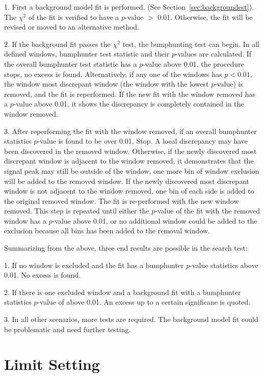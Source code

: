     1.  First a background model fit is performed. (See Section~\ref{sec:backgroundest}). The $\chi^{2}$ of the fit is verified to have a $p$-value $>$ 0.01. Otherwise, the fit will be revised or moved to an alternative method.

    2.  If the background fit passes the $\chi^{2}$ test, the bumphunting test can begin. In all defined windows, bumphunter test statistic and their $p$-values are calculated. If the overall bumphunter test statistic has a $p$-value above 0.01, the procedure stops, no excess is found. Alternatively, if any one of the windows has  $p< 0.01$, the window most discrepant window (the window with the lowest $p$-value) is removed, and the fit is reperformed. If the new fit with the window removed has a $p$-value above 0.01, it shows the discrepancy is completely contained in the window removed.

    3. After reperforming the fit with the window removed, if an overall bumphunter statistics $p$-value is found to be over 0.01, Stop. A local discrepancy may have been discovered in the removed window. Otherwise, if the newly discovered most discrepant window is adjacent to the window removed, it demonstrates that the signal peak may still be outside of the window, one more bin of window exclusion will be added to the removed window. If the newly discovered most discrepant window is not adjacent to the window removed, one bin of each side is added to the original removed window. The fit is re-performed with the new window removed. This step is repeated until either the $p$-value of the fit with the removed window has a $p$-value above 0.01, or no additional window could be added to the exclusion because all bins has been added to the removal window.

    Summarizing from the above, three end results are possible in the search test:

    1. If no window is excluded and the fit has a bumphunter $p$-value statistics above 0.01. No excess is found. 

    2. If there is one excluded window and a background fit with a bumphunter statistics $p$-value of above 0.01. An excess up to a certain significane is quoted.

    3. In all other scenarios, more tests are required. The background model fit could be problematic and need further testing.  

\section{Limit Setting}
\label{sec:limits}

